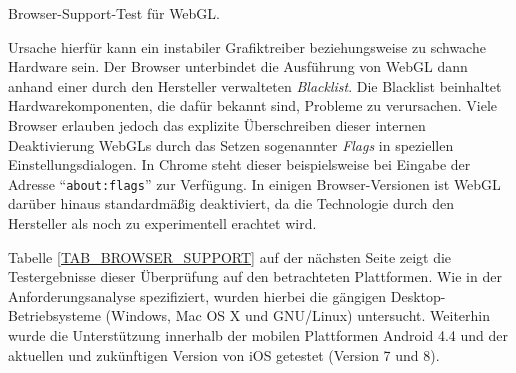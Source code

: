 \smallskip
\begin{listing}[!htb]
\caption{Browser-Support-Test für WebGL.}
\label{LISTING:EVAL_BROWSER_SUPPORT_WEBG}
\end{listing}

Ursache hierfür kann ein instabiler Grafiktreiber beziehungsweise zu schwache Hardware sein. Der Browser unterbindet die Ausführung von WebGL dann anhand einer durch den Hersteller verwalteten \emph{Blacklist}. Die Blacklist beinhaltet Hardwarekomponenten, die dafür bekannt sind, Probleme zu verursachen. Viele Browser erlauben jedoch das explizite Überschreiben dieser internen Deaktivierung WebGLs durch das Setzen sogenannter \emph{Flags} in speziellen Einstellungsdialogen. In Chrome steht dieser beispielsweise bei Eingabe der Adresse \enquote{\texttt{about:flags}} zur Verfügung. In einigen Browser-Versionen ist WebGL darüber hinaus standardmäßig deaktiviert, da die Technologie durch den Hersteller als noch zu experimentell erachtet wird.

Tabelle \ref{TAB_BROWSER_SUPPORT} auf der nächsten Seite zeigt die Testergebnisse dieser Überprüfung auf den betrachteten Plattformen. Wie in der Anforderungsanalyse spezifiziert, wurden hierbei die gängigen Desktop-Betriebsysteme (Windows, Mac OS X und GNU/Linux) untersucht. Weiterhin wurde die Unterstützung innerhalb der mobilen Plattformen Android 4.4 und der aktuellen und zukünftigen Version von iOS getestet (Version 7 und 8).

